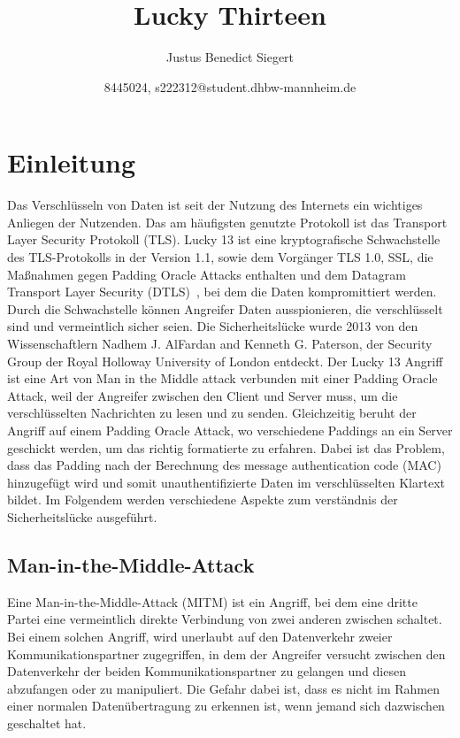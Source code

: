 \documentclass[a4paper,10pt]{scrartcl}
\begin{document}
    \title{Lucky Thirteen}
    \author{Justus Benedict Siegert}
    \date{8445024, s222312@student.dhbw-mannheim.de}
    \maketitle
    \tableofcontents
    \newpage


    \section{Einleitung}\label{sec:einleitung}
    Das Verschlüsseln von Daten ist seit der Nutzung des Internets ein wichtiges Anliegen der Nutzenden.
    Das am häufigsten genutzte Protokoll ist das Transport Layer Security Protokoll (TLS).
    Lucky 13 ist eine kryptografische Schwachstelle des TLS-Protokolls in der Version 1.1, sowie dem Vorgänger TLS 1.0, SSL, die Maßnahmen gegen Padding Oracle Attacks enthalten und dem Datagram Transport Layer Security (DTLS)~\cite[S.2]{AlFardan2013},
    bei dem die Daten kompromittiert werden.
    Durch die Schwachstelle können Angreifer Daten ausspionieren, die verschlüsselt sind und vermeintlich sicher seien.
    Die Sicherheitslücke wurde 2013 von den Wissenschaftlern Nadhem J. AlFardan and Kenneth G. Paterson, der Security Group der Royal Holloway University of London entdeckt.
    \newline
    Der Lucky 13 Angriff ist eine Art von Man in the Middle attack verbunden mit einer Padding Oracle Attack, weil der Angreifer zwischen den Client und Server muss, um die verschlüsselten Nachrichten zu lesen und zu senden.
    Gleichzeitig beruht der Angriff auf einem Padding Oracle Attack, wo verschiedene Paddings an ein Server geschickt werden, um das richtig formatierte zu erfahren.
    Dabei ist das Problem, dass das Padding nach der Berechnung des message authentication code (MAC) hinzugefügt wird und somit unauthentifizierte Daten im verschlüsselten Klartext bildet.
    Im Folgendem werden verschiedene Aspekte zum verständnis der Sicherheitslücke ausgeführt.

    \subsection{Man-in-the-Middle-Attack}\label{subsec:man-in-the-middle-attack}
    Eine Man-in-the-Middle-Attack (MITM) ist ein Angriff, bei dem eine dritte Partei eine vermeintlich direkte Verbindung von zwei anderen zwischen schaltet.
    Bei einem solchen Angriff, wird unerlaubt auf den Datenverkehr zweier Kommunikationspartner zugegriffen, in dem der Angreifer versucht zwischen den Datenverkehr der beiden Kommunikationspartner zu gelangen und diesen abzufangen oder zu manipuliert.
    Die Gefahr dabei ist, dass es nicht im Rahmen einer normalen Datenübertragung zu erkennen ist, wenn jemand sich dazwischen geschaltet hat.
\end{document}
